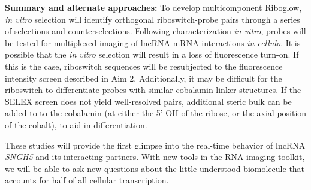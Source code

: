 
\textbf{Summary and alternate approaches:}
To develop multicomponent Riboglow, \textit{in vitro} selection will identify orthogonal riboswitch-probe pairs through a series of selections and counterselections.
Following characterization \textit{in vitro}, probes will be tested for multiplexed imaging of lncRNA-mRNA interactions \textit{in cellulo}. It is possible that the \textit{in vitro} selection will result in a loss of fluorescence turn-on. If this is the case, riboswitch sequences will be resubjected to the fluorescence intensity screen described in Aim 2.
Additionally, it may be difficult for the riboswitch to differentiate probes with similar cobalamin-linker structures. If the SELEX screen does not yield well-resolved pairs, additional steric bulk can be added to to the cobalamin (at either the 5' OH of the ribose, or the axial position of the cobalt), to aid in differentiation.

These studies will provide the first glimpse into the real-time behavior of lncRNA \textit{SNGH5} and its interacting partners. With new tools in the RNA imaging toolkit, we will be able to ask new questions about the little understood biomolecule that accounts for half of all cellular transcription.

